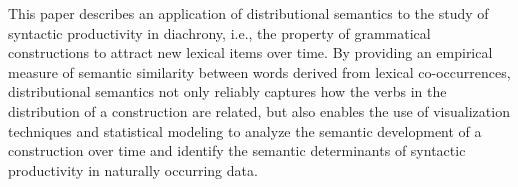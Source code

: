 This paper describes an application of distributional semantics to the study of syntactic productivity in diachrony, i.e., the property of grammatical constructions to attract new lexical items over time. By providing an empirical measure of semantic similarity between words derived from lexical co-occurrences, distributional semantics not only reliably captures how the verbs in the distribution of a construction are related, but also enables the use of visualization techniques and statistical modeling to analyze the semantic development of a construction over time and identify the semantic determinants of syntactic productivity in naturally occurring data.
